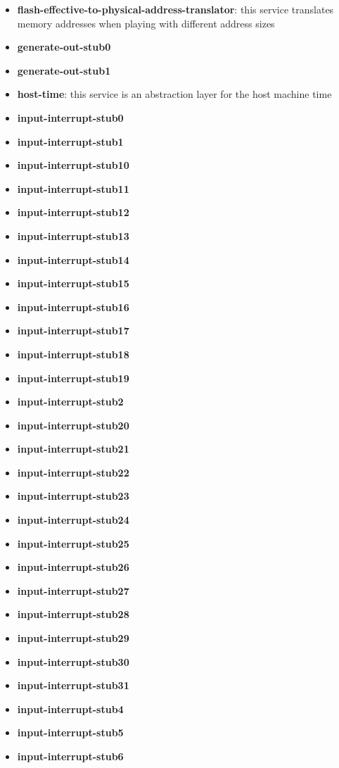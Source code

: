 \begin{itemize}
\item \textbf{flash-effective-to-physical-address-translator}: this service translates memory addresses when playing with different address sizes
\item \textbf{generate-out-stub0}
\item \textbf{generate-out-stub1}
\item \textbf{host-time}: this service is an abstraction layer for the host machine time
\item \textbf{input-interrupt-stub0}
\item \textbf{input-interrupt-stub1}
\item \textbf{input-interrupt-stub10}
\item \textbf{input-interrupt-stub11}
\item \textbf{input-interrupt-stub12}
\item \textbf{input-interrupt-stub13}
\item \textbf{input-interrupt-stub14}
\item \textbf{input-interrupt-stub15}
\item \textbf{input-interrupt-stub16}
\item \textbf{input-interrupt-stub17}
\item \textbf{input-interrupt-stub18}
\item \textbf{input-interrupt-stub19}
\item \textbf{input-interrupt-stub2}
\item \textbf{input-interrupt-stub20}
\item \textbf{input-interrupt-stub21}
\item \textbf{input-interrupt-stub22}
\item \textbf{input-interrupt-stub23}
\item \textbf{input-interrupt-stub24}
\item \textbf{input-interrupt-stub25}
\item \textbf{input-interrupt-stub26}
\item \textbf{input-interrupt-stub27}
\item \textbf{input-interrupt-stub28}
\item \textbf{input-interrupt-stub29}
\item \textbf{input-interrupt-stub30}
\item \textbf{input-interrupt-stub31}
\item \textbf{input-interrupt-stub4}
\item \textbf{input-interrupt-stub5}
\item \textbf{input-interrupt-stub6}

\end{itemize}
